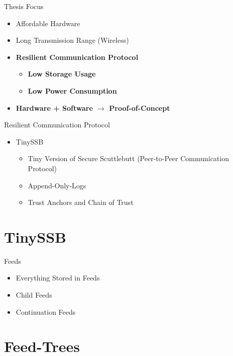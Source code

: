 \documentclass[aspectratio=169]{beamer}
\begin{document}
\begin{frame}[c]{Thesis Focus}
\begin{itemize}
    \item Affordable Hardware
    \item Long Transmission Range (Wireless)
    \item \textbf{Resilient Communication Protocol}
    \begin{itemize}
    	\item \textbf{Low Storage Usage}
	\item \textbf{Low Power Consumption}
    \end{itemize}
    \item \textbf{Hardware + Software $\rightarrow$ Proof-of-Concept}
\end{itemize}        
\end{frame}

\begin{frame}[c]{Resilient Communication Protocol}
\begin{itemize}
    \item TinySSB
    	\begin{itemize}
	    \item Tiny Version of Secure Scuttlebutt (Peer-to-Peer Communication Protocol) 
    	    \item Append-Only-Logs
    	    \item Trust Anchors and Chain of Trust
	\end{itemize}
\end{itemize}        
\end{frame}

\section{TinySSB}

\begin{frame}[c]{Feeds}
\begin{itemize}
    \item Everything Stored in Feeds
    \item Child Feeds
    \item Continuation Feeds
\end{itemize}        
\end{frame}

\section{Feed-Trees}
\end{document}
